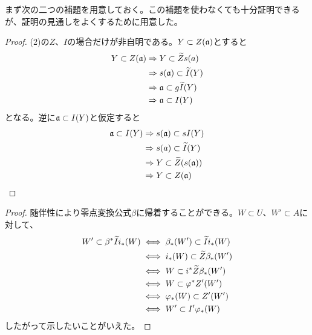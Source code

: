 \begin{rem}
  まず次の二つの補題を用意しておく。この補題を使わなくても十分証明できるが、証明の見通しをよくするために用意した。
\end{rem}
\begin{proof}
  (2)の$Z$、$I$の場合だけが非自明である。$Y \subset Z(\mathfrak{a})$とすると
  \begin{align*}
    Y \subset Z(\mathfrak{a}) &\Rightarrow Y \subset {\widetilde{Z}}s(a) \\
    &\Rightarrow s(\mathfrak{a}) \subset {\widetilde{I}}(Y)  \\
    &\Rightarrow \mathfrak{a} \subset g{\widetilde{I}}(Y) \\
    &\Rightarrow \mathfrak{a} \subset I(Y)
  \end{align*}
  となる。逆に$\mathfrak{a} \subset I(Y)$と仮定すると
  \begin{align*}
    \mathfrak{a} \subset I(Y) &\Rightarrow s(\mathfrak{a}) \subset sI(Y) \\
    &\Rightarrow s(a) \subset {\widetilde{I}}(Y) \\
    &\Rightarrow Y \subset {\widetilde{Z}}(s(\mathfrak{a})) \\
    &\Rightarrow Y \subset Z(\mathfrak{a})
   \end{align*}
\end{proof}


\begin{proof}
  随伴性により零点変換公式$\beta$に帰着することができる。$W \subset U$、$W' \subset A$に対して、
  \begin{align*}
    W' \subset \beta^* {\widetilde{I}} i_*(W)
    &\iff \beta_*(W') \subset  {\widetilde{I}} i_*(W) \\
    &\iff i_*(W) \subset {\widetilde{Z}} \beta_*(W') \\
    &\iff W \subset i^*{\widetilde{Z}} \beta_*(W') \\
    &\iff W \subset {\varphi}^* Z' (W') \\
    &\iff {\varphi}_*(W) \subset Z'(W') \\
    &\iff W' \subset I'{\varphi}_*(W)
  \end{align*}
  したがって示したいことがいえた。
\end{proof}


